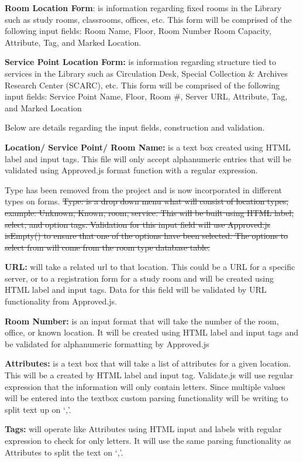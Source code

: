 \documentclass[letterpaper,10pt,titlepage, onecolumn, compsoc]{IEEEtran}
\begin{document}
\textbf{Room Location Form}: is information regarding fixed rooms in the Library such as study rooms, classrooms, offices, etc. This form will be comprised of the following input fields: Room Name, Floor, Room Number Room Capacity, Attribute, Tag, and Marked Location.

\textbf{Service Point Location Form:} is information regarding structure tied to services in the Library such as Circulation Desk, Special Collection \& Archives Research Center (SCARC), etc. This form will be comprised of the following input fields: Service Point Name, Floor, Room \#, Server URL, Attribute, Tag, and Marked Location

Below are details regarding the input fields, construction and validation.

\textbf{Location/ Service Point/ Room Name:} is a text box created using HTML label and input tags. This file will only accept alphanumeric entries that will be validated using Approved.js format function with a regular expression.

Type has been removed from the project and is now incorporated in different types on forms.
\st{Type: is a drop down menu what will consist of location types, example: Unknown, Known, room, service. This will be built using HTML label, select, and option tags. Validation for this input field will use Approved.js isEmpty() to ensure that one of the options have been selected. The options to select from will come from the room type database table. }


\textbf{URL:} will take a related url to that location. This could be a URL for a specific server, or to a registration form for a study room and will be created using HTML label and input tags. Data for this field will be validated by URL functionality from Approved.js.

\textbf{Room Number:} is an input format that will take the number of the room, office, or known location. It will be created using HTML label and input tags and be validated for alphanumeric formatting by Approved.js

\textbf{Attributes:} is a text box that will take a list of attributes for a given location. This will be a created by HTML label and input tag. Validate.js will use regular expression that the information will only contain letters. Since multiple values will be entered into the textbox custom parsing functionality will be writing to split text up on ‘,’.

\textbf{Tags:} will operate like Attributes using HTML input and labels with regular expression to check for only letters. It will use the same parsing functionality as Attributes to split the text on ‘,’.
\end{document}
